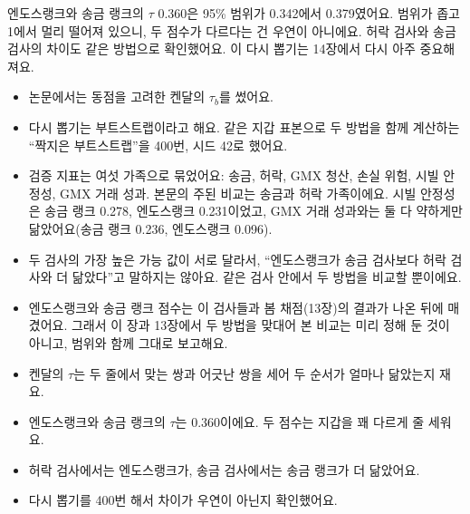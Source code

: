 엔도스랭크와 송금 랭크의 $\tau$ 0.360은 95\% 범위가 0.342에서 0.379였어요.
범위가 좁고 1에서 멀리 떨어져 있으니, 두 점수가 다르다는 건 우연이 아니에요.
허락 검사와 송금 검사의 차이도 같은 방법으로 확인했어요.
이 다시 뽑기는 14장에서 다시 아주 중요해져요.

\begin{deeper}[진짜 이름과 숫자]
\begin{itemize}
\item 논문에서는 동점을 고려한 켄달의 $\tau_b$를 썼어요.
\item 다시 뽑기는 부트스트랩이라고 해요. 같은 지갑 표본으로 두 방법을 함께 계산하는 “짝지은 부트스트랩”을 400번, 시드 42로 했어요.
\item 검증 지표는 여섯 가족으로 묶었어요: 송금, 허락, GMX 청산, 손실 위험, 시빌 안정성, GMX 거래 성과. 본문의 주된 비교는 송금과 허락 가족이에요. 시빌 안정성은 송금 랭크 0.278, 엔도스랭크 0.231이었고, GMX 거래 성과와는 둘 다 약하게만 닮았어요(송금 랭크 0.236, 엔도스랭크 0.096).
\item 두 검사의 가장 높은 가능 값이 서로 달라서, “엔도스랭크가 송금 검사보다 허락 검사와 더 닮았다”고 말하지는 않아요. 같은 검사 안에서 두 방법을 비교할 뿐이에요.
\item 엔도스랭크와 송금 랭크 점수는 이 검사들과 봄 채점(13장)의 결과가 나온 뒤에 매겼어요. 그래서 이 장과 13장에서 두 방법을 맞대어 본 비교는 미리 정해 둔 것이 아니고, 범위와 함께 그대로 보고해요.
\end{itemize}
\end{deeper}

\begin{learned}
\begin{itemize}
\item 켄달의 $\tau$는 두 줄에서 맞는 쌍과 어긋난 쌍을 세어 두 순서가 얼마나 닮았는지 재요.
\item 엔도스랭크와 송금 랭크의 $\tau$는 0.360이에요. 두 점수는 지갑을 꽤 다르게 줄 세워요.
\item 허락 검사에서는 엔도스랭크가, 송금 검사에서는 송금 랭크가 더 닮았어요.
\item 다시 뽑기를 400번 해서 차이가 우연이 아닌지 확인했어요.
\end{itemize}
\end{learned}
